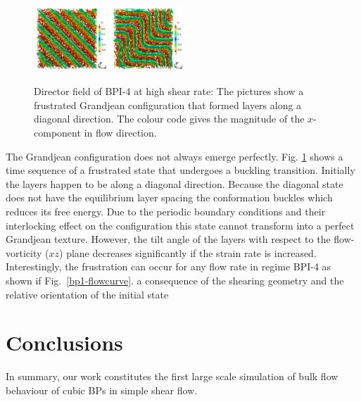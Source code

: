 \documentclass[8.5pt,twoside,twocolumn]{article}
\begin{document}
\begin{figure}[htpb]
\includegraphics[width=0.245\textwidth]{dir3d+y-450k_run916r.png}\nolinebreak
\includegraphics[width=0.245\textwidth]{dir3d+y-800k_run916r.png}
\caption{
Director field of BPI-4 at high shear rate: The pictures show a frustrated 
Grandjean configuration that formed layers along a diagonal direction. 
The colour code gives the magnitude of the $x$-component in flow direction. 
}
\label{bp1-4-frust}
\end{figure}


The Grandjean configuration does not always emerge perfectly.
Fig. \ref{bp1-4-frust} shows a time sequence of a frustrated state 
that undergoes a buckling transition.
Initially the layers happen to be along a diagonal direction. 
Because the diagonal state does not have the equilibrium layer spacing the conformation 
buckles which reduces its free energy.
Due to the periodic boundary conditions and their interlocking effect on the configuration 
this state cannot transform into a perfect Grandjean texture. However, the tilt angle of the
layers with respect to the flow-vorticity ($xz$) plane decreases significantly if the 
strain rate is increased.
Interestingly, the frustration can occur for any flow rate in regime BPI-4 as shown if Fig.~\ref{bp1-flowcurve}.
 a consequence of the shearing geometry and the relative orientation of the initial state


\section{Conclusions}

In summary, our work constitutes the first large scale simulation of bulk flow behaviour 
of cubic BPs in simple shear flow. 
  
\end{document}
